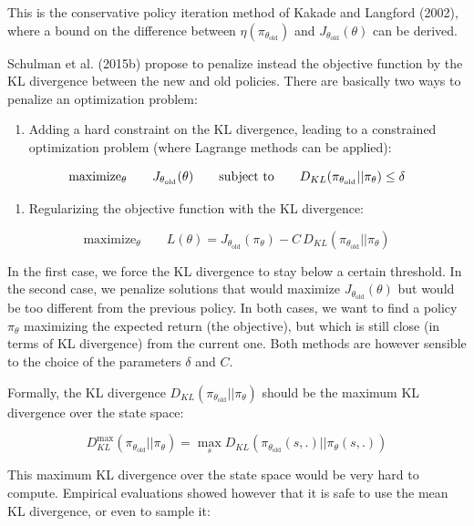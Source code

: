 \documentclass[
  letterpaper,
  DIV=11,
  numbers=noendperiod]{scrreprt}
\providecommand{\tightlist}{%
  \setlength{\itemsep}{0pt}\setlength{\parskip}{0pt}}\usepackage{longtable,booktabs,array}
\begin{document}
This is the conservative policy iteration method of Kakade and Langford
(2002), where a bound on the difference between
\(\eta(\pi_{\theta_\text{old}})\) and \(J_{\theta_\text{old}}(\theta)\)
can be derived.

Schulman et al. (2015b) propose to penalize instead the objective
function by the KL divergence between the new and old policies. There
are basically two ways to penalize an optimization problem:

\begin{enumerate}
\def\labelenumi{\arabic{enumi}.}
\tightlist
\item
  Adding a hard constraint on the KL divergence, leading to a
  constrained optimization problem (where Lagrange methods can be
  applied):
\end{enumerate}

\[
    \text{maximize}_\theta \qquad J_{\theta_\text{old}}(\theta) \\
    \qquad \text{subject to} \qquad D_{KL}(\pi_{\theta_\text{old}} || \pi_\theta) \leq \delta
\]

\begin{enumerate}
\def\labelenumi{\arabic{enumi}.}
\setcounter{enumi}{1}
\tightlist
\item
  Regularizing the objective function with the KL divergence:
\end{enumerate}

\[
    \text{maximize}_\theta \qquad L(\theta) = J_{\theta_\text{old}}(\pi_\theta) - C \,  D_{KL}(\pi_{\theta_\text{old}} || \pi_\theta)
\]

In the first case, we force the KL divergence to stay below a certain
threshold. In the second case, we penalize solutions that would maximize
\(J_{\theta_\text{old}}(\theta)\) but would be too different from the
previous policy. In both cases, we want to find a policy \(\pi_\theta\)
maximizing the expected return (the objective), but which is still close
(in terms of KL divergence) from the current one. Both methods are
however sensible to the choice of the parameters \(\delta\) and \(C\).

Formally, the KL divergence
\(D_{KL}(\pi_{\theta_\text{old}} || \pi_\theta)\) should be the maximum
KL divergence over the state space:

\[
    D^\text{max}_{KL}(\pi_{\theta_\text{old}} || \pi_\theta) = \max_s D_{KL}(\pi_{\theta_\text{old}}(s, .) || \pi_\theta(s, .))
\]

This maximum KL divergence over the state space would be very hard to
compute. Empirical evaluations showed however that it is safe to use the
mean KL divergence, or even to sample it:
\end{document}
